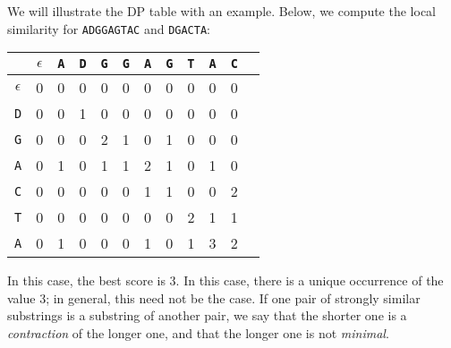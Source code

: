 \documentclass[a4paper, openany]{memoir}
\begin{document}
    We will illustrate the DP table with an example. Below, we compute the local similarity for \texttt{ADGGAGTAC} and \texttt{DGACTA}:
    \begin{table}[H]
        \centering
        \begin{tabular}{c|ccccccccccc}
            & $\epsilon$ & \texttt{A} & \texttt{D} & \texttt{G} & \texttt{G} & \texttt{A} & \texttt{G} & \texttt{T} & \texttt{A} & \texttt{C} \\
            \hline
            $\epsilon$ & 0 & 0 & 0 & 0 & 0 & 0 & 0 & 0 & 0 & 0 \\
            \texttt{D} & 0 & 0 & 1 & 0 & 0 & 0 & 0 & 0 & 0 & 0 \\
            \texttt{G} & 0 & 0 & 0 & 2 & 1 & 0 & 1 & 0 & 0 & 0 \\
            \texttt{A}& 0 & 1 & 0 & 1 & 1 & 2 & 1 & 0 & 1 & 0 \\
            \texttt{C} & 0 & 0 & 0 & 0 & 0 & 1 & 1 & 0 & 0 & 2 \\
            \texttt{T} & 0 & 0 & 0 & 0 & 0 & 0 & 0 & 2 & 1 & 1 \\
            \texttt{A} & 0 & 1 & 0 & 0 & 0 & 1 & 0 & 1 & {\color{red} 3} & 2
        \end{tabular}
    \end{table}
    \noindent In this case, the best score is 3. In this case, there is a unique occurrence of the value 3; in general, this need not be the case. If one pair of strongly similar substrings is a substring of another pair, we say that the shorter one is a \emph{contraction} of the longer one, and that the longer one is not \emph{minimal}.
    
\end{document}
